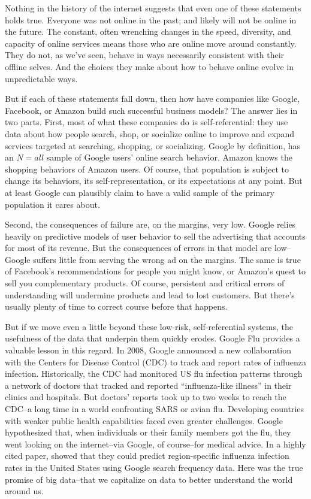 \documentclass[12pt]{article}
\begin{document}
Nothing in the history of the internet suggests that even one of
these statements holds true. Everyone was not online in the past; and
likely will not be online in the future. The constant, often
wrenching changes in the speed, diversity, and capacity of online
services means those who are online move around constantly. They do
not, as we've seen, behave in ways necessarily consistent with their
offline selves. And the choices they make about how to behave online
evolve in unpredictable ways. 

But if each of these statements fall down, then how have companies
like Google, Facebook, or Amazon build such successful business
models? The answer lies in two parts. First, most of what these
companies do is self-referential: they use data about how people
search, shop, or socialize online to improve and expand services
targeted at searching, shopping, or socializing. Google by definition,
has an $N=all$ sample of Google users' online search
behavior. Amazon knows the shopping behaviors of Amazon users. Of
course, that population is subject to change its behaviors, its
self-representation, or its expectations at any point. But at least
Google can plausibly claim to have a valid sample of the primary
population it cares about. 

Second, the consequences of failure are, on the margins, very
low. Google relies heavily on predictive models of user behavior to
sell the advertising that accounts for most of its revenue. But the
consequences of errors in that model are low--Google suffers little
from serving the wrong ad on the margins. The same is true of
Facebook's recommendations for people you might know, or Amazon's
quest to sell you complementary products. Of course, persistent and
critical errors of understanding will undermine products and lead to
lost customers. But there's usually plenty of time to correct course
before that happens. 

But if we move even a little beyond these low-risk, self-referential
systems, the usefulness of the data that underpin them quickly
erodes. Google Flu provides a valuable lesson in this regard. In 2008,
Google announced a new collaboration with the Centers for Disease
Control (CDC) to track and report rates of influenza
infection. Historically, the CDC had monitored US flu infection
patterns through a network of doctors that tracked and reported
``influenza-like illness'' in their clinics and hospitals. But
doctors' reports took up to two weeks to reach the CDC--a long time in
a world confronting SARS or avian flu. Developing countries with
weaker public health capabilities faced even greater
challenges. Google hypothesized that, when individuals or their family
members got the flu, they went looking on the internet--via Google, of
course--for medical advice. In a highly cited paper,
\cite{ginsberg2008detecting} showed that they could predict
region-specific influenza infection rates in the United States using
Google search frequency data. Here was the true promise of big
data--that we capitalize on data to better understand the world around
us.
\end{document}
